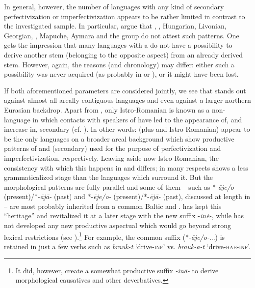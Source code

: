 \documentclass[output=paper]{langsci/langscibook}
\begin{document}
In general, however, the number of languages with any kind of secondary perfectivization or imperfectivization appears to be rather limited in contrast to the investigated sample. In particular, \citet{ArkadievShluinsky2015} argue that , , Hungarian, Livonian, Georgian, , Mapuche, Aymara and the  group do not attest such patterns. One gets the impression that many languages with a  do not have a possibility to derive another stem (belonging to the opposite aspect) from an already derived stem. However, again, the reasons (and chronology) may differ: either such a possibility was never acquired (as probably in  or ), or it might have been lost.

If both aforementioned parameters are considered jointly, we see that  stands out against almost all areally contiguous languages and even against a larger northern Eurasian backdrop. Apart from , only Istro-Romanian is known as a non- language in which contacts with speakers of  have led to the appearance of, and increase in, secondary  (cf. \citealt{Arkadievforthcoming}
). In other words:  (plus  and Istro-Romanian) appear to be the only languages on a broader areal background which show productive patterns of  and (secondary)  used for the purpose of perfectivization and imperfectivization, respectively. Leaving aside now Istro-Romanian, the consistency with which this happens in  and  differs;  in many respects shows a less grammaticalized stage than the  languages which surround it. But the morphological patterns are fully parallel and some of them – such as *-\textit{āje/o-} (present)/*-\textit{ājā-} (past) and *-\textit{ēje/o-} (present)/*-\textit{ējā-} (past), discussed at length in  – are most probably inherited from a common Baltic and  .  has kept this “heritage” and revitalized it at a later stage with the new suffix -\textit{in\.e-}, while  has not developed any new productive aspectual  which would go beyond strong lexical restrictions (see ).\footnote{It did, however, create a somewhat productive suffix \textit{-inā-} to derive morphological causatives and other deverbatives.} For example, the common suffix (*-\textit{āje/o-}...) is retained in just a few verbs such as \textit{brauk-t} ‘drive-\textsc{inf}’ vs. \textit{brauk-ā-t} ‘drive-\textsc{hab-inf}’.
\end{document}
